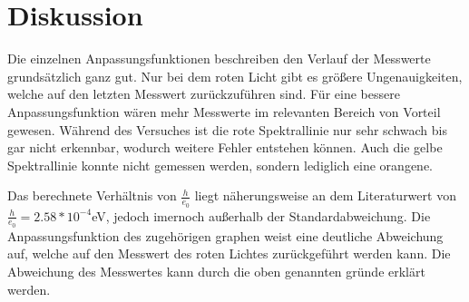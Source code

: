 \section{Diskussion}
\label{sec:Diskussion}


Die einzelnen Anpassungsfunktionen beschreiben den Verlauf der Messwerte grundsätzlich ganz gut. Nur bei dem
roten Licht gibt es größere Ungenauigkeiten, welche auf den letzten Messwert zurückzuführen sind. Für eine
bessere Anpassungsfunktion wären mehr Messwerte im relevanten Bereich von Vorteil gewesen. Während des Versuches ist
die rote Spektrallinie nur sehr schwach bis gar nicht erkennbar, wodurch weitere Fehler entstehen können.
Auch die gelbe Spektrallinie konnte nicht gemessen werden, sondern lediglich eine orangene.

Das berechnete Verhältnis von $\frac{h}{e_0}$ liegt näherungsweise an dem Literaturwert von $\frac{h}{e_0} = 2.58 *10^{-4}$eV, jedoch
imernoch außerhalb der Standardabweichung. Die Anpassungsfunktion des zugehörigen graphen weist eine deutliche Abweichung auf,
welche auf den Messwert des roten Lichtes zurückgeführt werden kann. Die Abweichung des Messwertes kann durch die oben
genannten gründe erklärt werden. 
